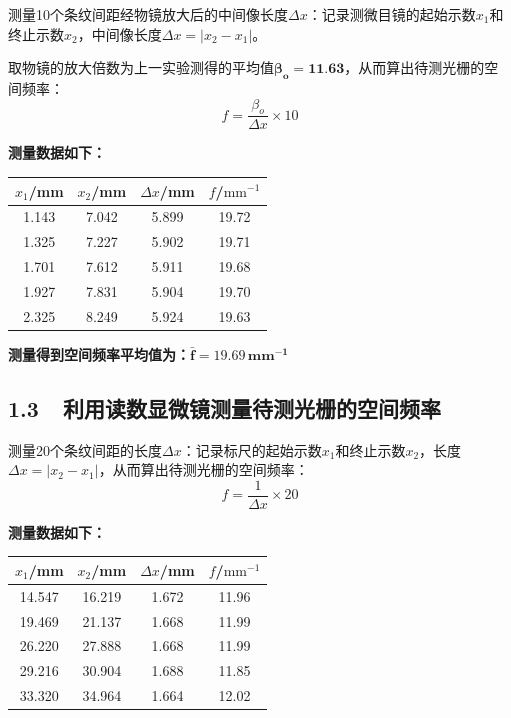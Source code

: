 \documentclass{ctexbook}
\begin{document}
\noindent 测量10个条纹间距经物镜放大后的中间像长度$\Delta x$：记录测微目镜的起始示数$x_1$和终止示数$x_2$，中间像长度$\Delta x = |x_2 - x_1|$。
\medskip

\noindent 取物镜的放大倍数为上一实验测得的平均值$\bm{\beta_o =} \textbf{11.63}$，从而算出待测光栅的空间频率：
\[f = \frac{\beta_o}{\Delta x} \times 10\]

\noindent \textbf{测量数据如下：}
\begin{table}[ht!]
    \begin{center}
        \begin{tabular}{|c|c|c|c|}
            \hline
            $x_1$/mm & $x_2$/mm & $\Delta x$/mm & $f$/$\mathrm{mm^{-1}}$ \\
            \hline
            1.143 & 7.042 & 5.899 & 19.72 \\
            \hline
            1.325 & 7.227 & 5.902 & 19.71 \\
            \hline
            1.701 & 7.612 & 5.911 & 19.68 \\
            \hline
            1.927 & 7.831 & 5.904 & 19.70 \\
            \hline
            2.325 & 8.249 & 5.924 & 19.63 \\
            \hline
        \end{tabular}
    \end{center}
\end{table}

\noindent \textbf{测量得到空间频率平均值为：}$\bm{\bar{f} = 19.69}\,\mathbf{mm^{-1}}$

\bigskip
\subsection*{ 1.3\ \ 利用读数显微镜测量待测光栅的空间频率}

\noindent 测量20个条纹间距的长度$\Delta x$：记录标尺的起始示数$x_1$和终止示数$x_2$，长度$\Delta x = |x_2 - x_1|$，从而算出待测光栅的空间频率：
\[f = \frac{1}{\Delta x} \times 20\]

\noindent \textbf{测量数据如下：}
\begin{table}[ht!]
    \begin{center}
        \begin{tabular}{|c|c|c|c|}
            \hline
            $x_1$/mm & $x_2$/mm & $\Delta x$/mm & $f$/$\mathrm{mm^{-1}}$ \\
            \hline
            14.547 & 16.219 & 1.672 & 11.96 \\
            \hline
            19.469 & 21.137 & 1.668 & 11.99 \\
            \hline
            26.220 & 27.888 & 1.668 & 11.99 \\
            \hline
            29.216 & 30.904 & 1.688 & 11.85 \\
            \hline
            33.320 & 34.964 & 1.664 & 12.02 \\
            \hline
        \end{tabular}
    \end{center}
\end{table}
\end{document}
